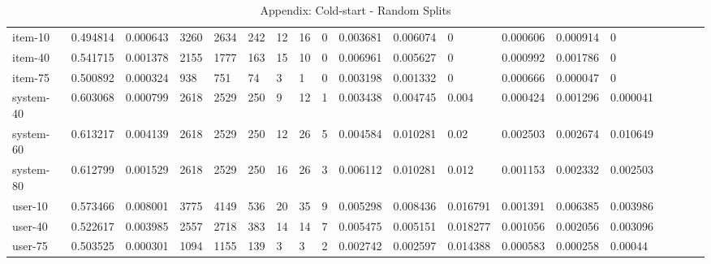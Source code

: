\begin{table}
{\begin{tabular}{*{19}l}
item-10		&	0.494814 &	0.000643 &	3260 &	2634 &	242 &	12 &	16 &	0 &	0.003681 &	0.006074 &	0 &	0.000606 &	0.000914 &	0 &	 \\
item-40		&	0.541715 &	0.001378 &	2155 &	1777 &	163 &	15 &	10 &	0 &	0.006961 &	0.005627 &	0 &	0.000992 &	0.001786 &	0 &	 \\
item-75		&	0.500892 &	0.000324 &	938 &	751 &	74 &	3  &	1 &	0 &	0.003198 &	0.001332 &	0 &	0.000666 &	0.000047 &	0 &	 \\
system-40	&	0.603068 &	0.000799 &	2618 &	2529 &	250 &	9  &	12 &	1 &	0.003438 &	0.004745 &	0.004 &	0.000424 &	0.001296 &	0.000041 &	 \\
system-60	&	0.613217 &	0.004139 &	2618 &	2529 &	250 &	12 &	26 &	5 &	0.004584 &	0.010281 &	0.02 &	0.002503 &	0.002674 &	0.010649 &	 \\
system-80	&	0.612799 &	0.001529 &	2618 &	2529 &	250 &	16 &	26 &	3 &	0.006112 &	0.010281 &	0.012 &	0.001153 &	0.002332 &	0.002503 &	 \\
user-10		&	0.573466 &	0.008001 &	3775 &	4149 &	536 &	20 &	35 &	9 &	0.005298 &	0.008436 &	0.016791 &	0.001391 &	0.006385 &	0.003986 &	 \\
user-40		&	0.522617 &	0.003985 &	2557 &	2718 &	383 &	14 &	14 &	7 &	0.005475 &	0.005151 &	0.018277 &	0.001056 &	0.002056 &	0.003096 &	 \\
user-75		&	0.503525 &	0.000301 &	1094 &	1155 &	139 &	3 &	3 &	2 &	0.002742 &	0.002597 &	0.014388 &	0.000583 &	0.000258 &	0.00044 &	 \\







\bottomrule
\end{tabular}
}
\caption{Appendix: Cold-start - Random Splits}
\end{table}

